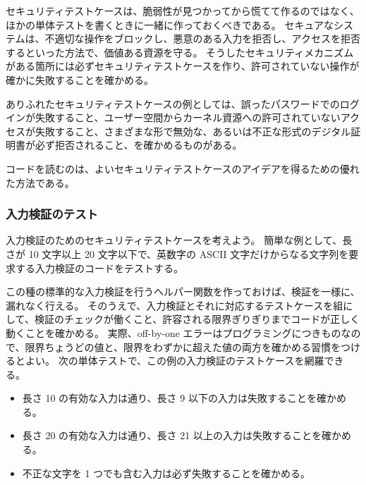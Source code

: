 \documentclass[uplatex]{jsarticle}
\def\label#1{}%
\begin{document}
セキュリティテストケースは、脆弱性が見つかってから慌てて作るのではなく、ほかの単体テストを書くときに一緒に作っておくべきである。
セキュアなシステムは、不適切な操作をブロックし、悪意のある入力を拒否し、アクセスを拒否するといった方法で、価値ある資源を守る。
そうしたセキュリティメカニズムがある箇所には必ずセキュリティテストケースを作り、許可されていない操作が確かに失敗することを確かめる。

\begin{exa}[ありふれたセキュリティテストケース]\label{exa:ch12-common-test-cases}
ありふれたセキュリティテストケースの例としては、誤ったパスワードでのログインが失敗すること、ユーザー空間からカーネル資源への許可されていないアクセスが失敗すること、さまざまな形で無効な、あるいは不正な形式のデジタル証明書が必ず拒否されること、を確かめるものがある。
\end{exa}

コードを読むのは、よいセキュリティテストケースのアイデアを得るための優れた方法である。

\subsubsection{入力検証のテスト}

入力検証のためのセキュリティテストケースを考えよう。
簡単な例として、長さが 10 文字以上 20 文字以下で、英数字の ASCII 文字だけからなる文字列を要求する入力検証のコードをテストする。

この種の標準的な入力検証を行うヘルパー関数を作っておけば、検証を一様に、漏れなく行える。
そのうえで、入力検証とそれに対応するテストケースを組にして、検証のチェックが働くこと、許容される限界ぎりぎりまでコードが正しく動くことを確かめる。
実際、off-by-one エラーはプログラミングにつきものなので、限界ちょうどの値と、限界をわずかに超えた値の両方を確かめる習慣をつけるとよい。
次の単体テストで、この例の入力検証のテストケースを網羅できる。

\begin{exa}[長さと文字種の入力検証のテストケース]\label{exa:ch12-input-validation-tests}
\begin{itemize}
\item 長さ 10 の有効な入力は通り、長さ 9 以下の入力は失敗することを確かめる。
\item 長さ 20 の有効な入力は通り、長さ 21 以上の入力は失敗することを確かめる。
\item 不正な文字を 1 つでも含む入力は必ず失敗することを確かめる。
\end{itemize}
\end{exa}
\end{document}
